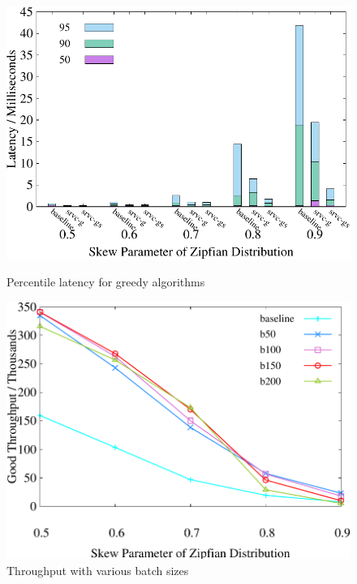 \begin{figure}[t]
    \centering
    \begin{minipage}[b]{0.32\linewidth}
        \centering
        \includegraphics[width=\textwidth]{./exp_fig/fvs/percent95_latency}
        \vspace{-2em}
        \caption{Percentile latency for greedy algorithms}
        \label{fig:fvs:p95}
    \end{minipage}
    \begin{minipage}[b]{0.32\linewidth}
            \centering
            \includegraphics[width=\textwidth]{./exp_fig/bsize/tps}
            \vspace{-2em}
            \caption{Throughput with various batch sizes}
            \label{fig:bsize:tps}

\end{minipage}
\end{figure}
